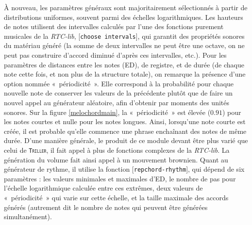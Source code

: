 \documentclass[a4paper,12pt]{article}
\newcommand{\guill}[1]{«~#1~»}
\newcommand{\module}[1]{\texttt{\textsc{#1}}}
\newcommand{\patch}[1]{[\texttt{#1}]}
\begin{document}
À nouveau, les paramètres généraux sont majoritairement sélectionnés à partir de distributions uniformes, souvent parmi des échelles logarithmiques. Les hauteurs de notes utilisent des intervalles calculés par l'une des fonctions purement musicales de la \emph{RTC-lib}, \patch{choose intervals}, qui garantit des propriétés sonores du matériau généré (la somme de deux intervalles ne peut être une octave, on ne peut pas construire d'accord diminué d'après ces intervalles, etc.). Pour les paramètres de distances entre les notes (ED), de registre, et de durée (de chaque note cette fois, et non plus de la structure totale), on remarque la présence d'une option nommée \guill{périodicité}. Elle correspond à la probabilité pour chaque nouvelle note de conserver les valeurs de la précédente plutôt que de faire un nouvel appel au générateur aléatoire, afin d'obtenir par moments des unités sonores. Sur la figure \ref{melochordmain}, la \guill{périodicité} est élevée ($0.91$) pour les notes courtes et nulle pour les notes longues. Ainsi, lorsqu'une note courte est créée, il est probable qu'elle commence une phrase enchaînant des notes de même durée. D'une manière générale, le produit de ce module devant être plus varié que celui de \module{Triller}, il fait appel à plus de fonctions complexes de la \emph{RTC-lib}. La génération du volume fait ainsi appel à un mouvement brownien. Quant au générateur de rythme, il utilise la fonction \patch{repchord-rhythm}, qui dépend de six paramètres : les valeurs minimales et maximales d'ED, le nombre de pas pour l'échelle logarithmique calculée entre ces extrêmes, deux valeurs de \guill{périodicité} qui varie sur cette échelle, et la taille maximale des accords générés (autrement dit le nombre de notes qui peuvent être générées simultanément).
\end{document}
